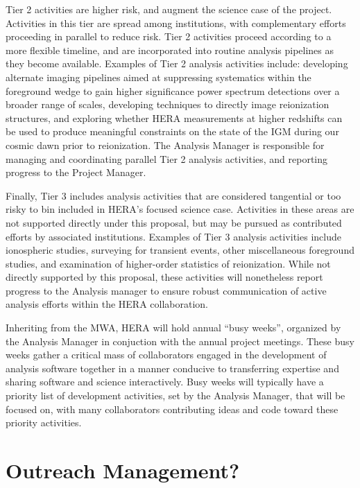 \documentclass[preprint]{aastex}
\begin{document}
Tier 2 activities are higher risk, and augment the science case of the project.  Activities in
this tier are spread among institutions, with complementary efforts proceeding in parallel to
reduce risk.  Tier 2 activities proceed according to a more flexible timeline, and are incorporated
into routine analysis pipelines as they become available.  Examples of Tier 2 analysis activities
include:
developing alternate imaging pipelines aimed at suppressing systematics within the foreground wedge
to gain higher significance power spectrum detections over a broader range of scales, developing
techniques to directly image reionization structures, and exploring whether HERA measurements at
higher redshifts can be used to produce meaningful constraints on the state of the IGM during
our cosmic dawn prior to reionization.  The Analysis Manager is responsible for managing and coordinating
parallel Tier 2 analysis activities, and reporting progress to the Project Manager.

Finally, Tier 3 includes analysis activities that are considered tangential or too risky to
bin included in HERA's focused science case.
Activities in these areas are not supported directly under this proposal, but may be pursued as
contributed efforts by associated institutions.  Examples of Tier 3 analysis activities include
ionospheric studies, surveying for transient events, other miscellaneous foreground studies, and
examination of higher-order statistics of reionization.  While not directly supported by this proposal,
these activities will nonetheless report progress to the Analysis manager to ensure
robust communication of active analysis efforts within the HERA collaboration.

Inheriting from the MWA, HERA will hold annual ``busy weeks'', organized by the Analysis Manager in
conjuction with the annual project meetings.  These busy weeks gather a critical
mass of collaborators engaged in the development of analysis software together in a manner conducive to
transferring expertise and sharing software and science interactively.  Busy weeks will typically
have a priority list of development activities, set by the Analysis Manager, that will be 
focused on, with many collaborators contributing
ideas and code toward these priority activities.

\section{Outreach Management?}
\end{document}
